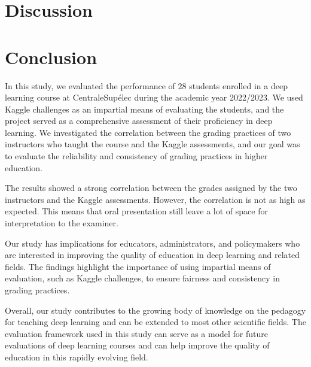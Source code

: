 \documentclass[a4paper]{article}
\begin{document}
	\section{Discussion}
	
	\section{Conclusion}
	In this study, we evaluated the performance of 28 students enrolled in a deep learning course at CentraleSupélec during the academic year 2022/2023.
	We used Kaggle challenges as an impartial means of evaluating the students, and the project served as a comprehensive assessment of their proficiency in deep learning.
	We investigated the correlation between the grading practices of two instructors who taught the course and the Kaggle assessments, and our goal was to evaluate the reliability and consistency of grading practices in higher education.
	
	The results showed a strong correlation between the grades assigned by the two instructors and the Kaggle assessments.
	However, the correlation is not as high as expected.
	This means that oral presentation still leave a lot of space for interpretation to the examiner.
	
	Our study has implications for educators, administrators, and policymakers who are interested in improving the quality of education in deep learning and related fields.
	The findings highlight the importance of using impartial means of evaluation, such as Kaggle challenges, to ensure fairness and consistency in grading practices.
	
	Overall, our study contributes to the growing body of knowledge on the pedagogy for teaching deep learning and can be extended to most other scientific fields.
	The evaluation framework used in this study can serve as a model for future evaluations of deep learning courses and can help improve the quality of education in this rapidly evolving field.
\end{document}
